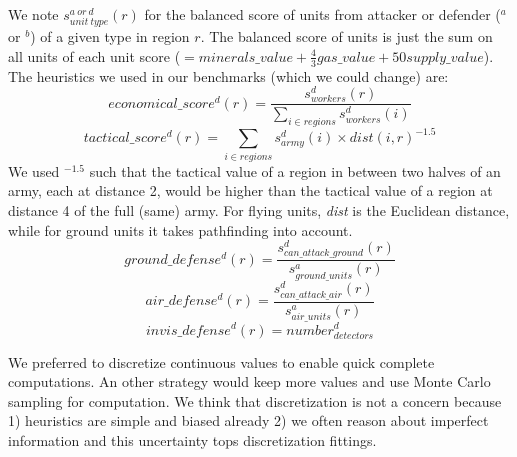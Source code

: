 We note $s^{a\ or\ d}_{unit\ type}(r)$ for the balanced score of units from attacker or defender ($^{a}$ or $^{b}$) of a given type in region $r$. The balanced score of units is just the sum on all units of each unit score ($= minerals\_value + \frac{4}{3}gas\_value + 50supply\_value$). The heuristics we used in our benchmarks (which we could change) are: 
$$economical\_score^d(r) = \frac{s^d_{workers}(r)}{\sum_{i \in regions} s^d_{workers}(i)}$$
$$tactical\_score^d(r) = \sum_{i \in regions} s^d_{army}(i) \times dist(i,r)^{-1.5}$$
We used $^{-1.5}$ such that the tactical value of a region in between two halves of an army, each at distance 2, would be higher than the tactical value of a region at distance 4 of the full (same) army. For flying units, \textit{dist} is the Euclidean distance, while for ground units it takes pathfinding into account.
$$ground\_defense^d(r) = \frac{s^d_{can\_attack\_ground}(r)}{s^a_{ground\_units}(r)}$$
$$air\_defense^d(r) = \frac{s^d_{can\_attack\_air}(r)}{s^a_{air\_units}(r)}$$
$$invis\_defense^d(r) = number^d_{detectors}$$

We preferred to discretize continuous values to enable quick complete computations. An other strategy would keep more values and use Monte Carlo sampling for computation. We think that discretization is not a concern because 1) heuristics are simple and biased already 2) we often reason about imperfect information and this uncertainty tops discretization fittings.
